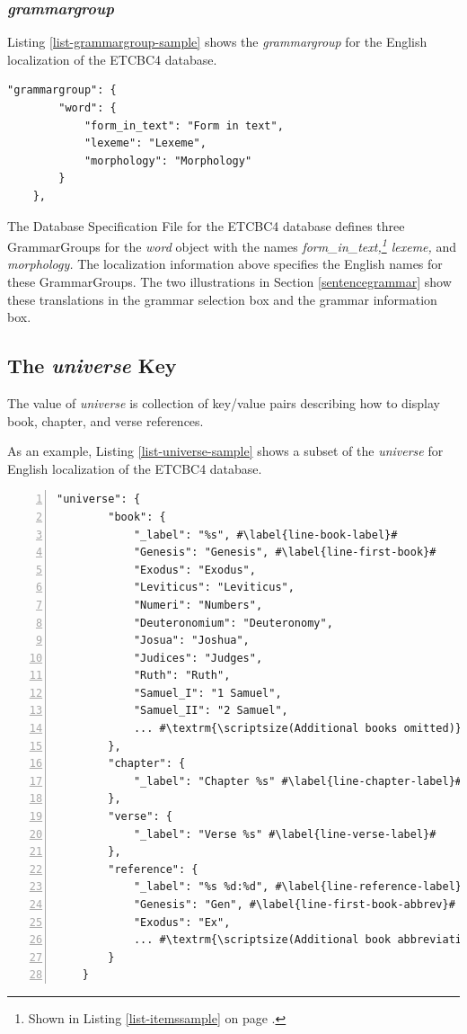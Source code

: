 \documentclass[11pt,oneside,a4paper]{memoir}
\begin{document}
\subsubsection{\emph{grammargroup}}

Listing \ref{list-grammargroup-sample} shows the \emph{grammargroup} for the English localization of
the ETCBC4 database.

\begin{lstlisting}[caption=A sample grammargroup value,label=list-grammargroup-sample]
    "grammargroup": {
        "word": {
            "form_in_text": "Form in text",
            "lexeme": "Lexeme",
            "morphology": "Morphology"
        }
    },
\end{lstlisting}

The Database Specification File for the ETCBC4 database defines three GrammarGroups for the
\emph{word} object with the names \emph{form\_in\_text,\footnote{Shown in Listing
    \ref{list-itemssample} on page \pageref{list-itemssample}.} lexeme,} and \emph{morphology.} The
localization information above specifies the English names for these GrammarGroups. The two
illustrations in Section \ref{sentencegrammar} show these translations in the grammar selection
box and the grammar information box.

\subsection{The \emph{universe} Key}\label{universe-loc}

The value of \emph{universe} is collection of key/value pairs describing how to display book,
chapter, and verse references.

As an example, Listing \ref{list-universe-sample} shows a subset of the \emph{universe} for English
localization of the ETCBC4 database.

\begin{lstlisting}[escapechar=\#,numbers=left,caption=A subset of the universe value,label=list-universe-sample]
    "universe": {
        "book": {
            "_label": "%s", #\label{line-book-label}#
            "Genesis": "Genesis", #\label{line-first-book}#
            "Exodus": "Exodus",
            "Leviticus": "Leviticus",
            "Numeri": "Numbers",
            "Deuteronomium": "Deuteronomy",
            "Josua": "Joshua",
            "Judices": "Judges",
            "Ruth": "Ruth",
            "Samuel_I": "1 Samuel",
            "Samuel_II": "2 Samuel",
            ... #\textrm{\scriptsize(Additional books omitted)}\label{line-last-book}#
        },
        "chapter": {
            "_label": "Chapter %s" #\label{line-chapter-label}#
        },
        "verse": {
            "_label": "Verse %s" #\label{line-verse-label}#
        },
        "reference": {
            "_label": "%s %d:%d", #\label{line-reference-label}#
            "Genesis": "Gen", #\label{line-first-book-abbrev}#
            "Exodus": "Ex",
            ... #\textrm{\scriptsize(Additional book abbreviations omitted)}\label{line-last-book-abbrev}#
        }
    }
\end{lstlisting}
\end{document}
